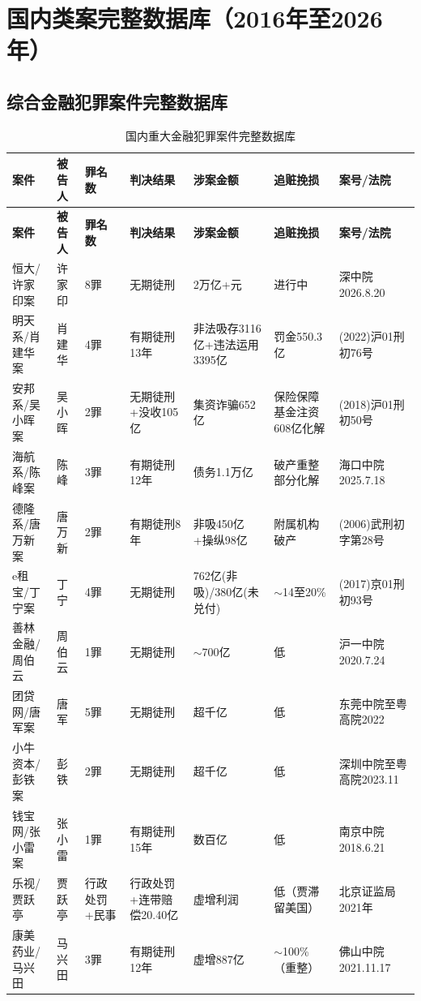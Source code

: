 \documentclass[11pt,a4paper,oneside,openany]{article}
\begin{document}
\section{国内类案完整数据库（2016年至2026年）}
\subsection{综合金融犯罪案件完整数据库}
\begin{longtable}{p{2cm}p{2cm}p{1.1cm}p{2.3cm}p{2.3cm}p{2.3cm}p{1.8cm}}
\caption{国内重大金融犯罪案件完整数据库}\label{tab:domestic}\\
\toprule
\textbf{案件} & \textbf{被告人} & \textbf{罪名数} & \textbf{判决结果} & \textbf{涉案金额} & \textbf{追赃挽损} & \textbf{案号/法院} \\
\midrule
\endfirsthead
\toprule
\textbf{案件} & \textbf{被告人} & \textbf{罪名数} & \textbf{判决结果} & \textbf{涉案金额} & \textbf{追赃挽损} & \textbf{案号/法院} \\
\midrule
\endhead
\bottomrule
\endlastfoot
恒大/许家印案 & 许家印 & 8罪 & 无期徒刑 & 2万亿+元 & 进行中 & 深中院2026.8.20 \\
明天系/肖建华案 & 肖建华 & 4罪 & 有期徒刑13年 & 非法吸存3116亿+违法运用3395亿 & 罚金550.3亿 & (2022)沪01刑初76号 \\
安邦系/吴小晖案 & 吴小晖 & 2罪 & 无期徒刑+没收105亿 & 集资诈骗652亿 & 保险保障基金注资608亿化解 & (2018)沪01刑初50号 \\
海航系/陈峰案 & 陈峰 & 3罪 & 有期徒刑12年 & 债务1.1万亿 & 破产重整部分化解 & 海口中院2025.7.18 \\
德隆系/唐万新案 & 唐万新 & 2罪 & 有期徒刑8年 & 非吸450亿+操纵98亿 & 附属机构破产 & (2006)武刑初字第28号 \\
\midrule
e租宝/丁宁案 & 丁宁 & 4罪 & 无期徒刑 & 762亿(非吸)/380亿(未兑付) & $\sim$14至20\% & (2017)京01刑初93号 \\
善林金融/周伯云 & 周伯云 & 1罪 & 无期徒刑 & $\sim$700亿 & 低 & 沪一中院2020.7.24 \\
团贷网/唐军案 & 唐军 & 5罪 & 无期徒刑 & 超千亿 & 低 & 东莞中院至粤高院2022 \\
小牛资本/彭铁案 & 彭铁 & 2罪 & 无期徒刑 & 超千亿 & 低 & 深圳中院至粤高院2023.11 \\
钱宝网/张小雷案 & 张小雷 & 1罪 & 有期徒刑15年 & 数百亿 & 低 & 南京中院2018.6.21 \\
\midrule
乐视/贾跃亭 & 贾跃亭 & 行政处罚+民事 & 行政处罚+连带赔偿20.40亿 & 虚增利润 & 低（贾滞留美国） & 北京证监局2021年 \\
康美药业/马兴田 & 马兴田 & 3罪 & 有期徒刑12年 & 虚增887亿 & $\sim$100\%（重整） & 佛山中院2021.11.17 \\

\end{longtable}
\end{document}
